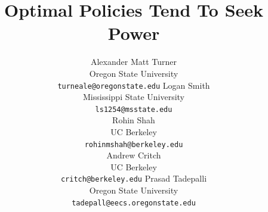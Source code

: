 \documentclass{article}
\begin{document}
\title{Optimal Policies Tend To Seek Power} 
\author{
Alexander Matt Turner\\
Oregon State University\\
\texttt{turneale@oregonstate.edu} 
\And
Logan Smith\\
Mississippi State University\\
\texttt{ls1254@msstate.edu} \\
\And
Rohin Shah\\
UC Berkeley\\
\texttt{rohinmshah@berkeley.edu}\\
\And 
Andrew Critch\\
UC Berkeley\\
\texttt{critch@berkeley.edu}
\And
Prasad Tadepalli\\
Oregon State University\\
\texttt{tadepall@eecs.oregonstate.edu}\\
}

\maketitle 









{\small}

%

\clearpage

\begin{appendices}





\end{appendices}
\end{document}
